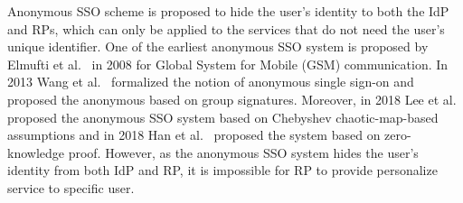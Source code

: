 

Anonymous SSO scheme is proposed to hide the user's identity to both the IdP and RPs, which can only be applied to the services that do not need the user's unique identifier.
One of the earliest anonymous SSO system is proposed by Elmufti et al.~\cite{ElmuftiWRR08} in 2008 for Global System for Mobile (GSM) communication. In 2013 Wang et al.~\cite{WangWS13} formalized the notion of anonymous single sign-on and proposed the anonymous based on group signatures. Moreover, in 2018 Lee et al.~\cite{Lee18} proposed the anonymous SSO system  based on Chebyshev chaotic-map-based assumptions and in 2018 Han et al.~\cite{HanCSTW18} proposed the system based on zero-knowledge proof. However, as the anonymous SSO system hides the user's identity from both IdP and RP, it is impossible for RP to provide personalize service to specific user.

